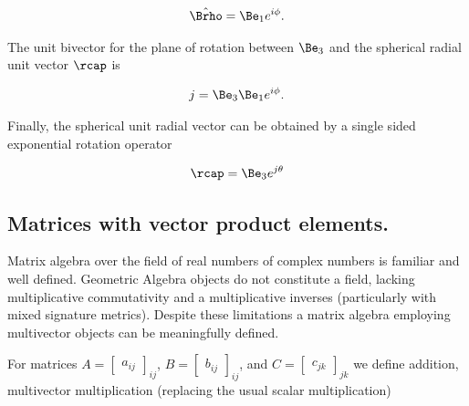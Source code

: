 \begin{align}\label{eqn:mp60}
\hat{\Brho} = \Be_1 e^{i \phi}.
\end{align}

The unit bivector for the plane of rotation between $\Be_3$ and the spherical radial unit vector $\rcap$ is

\begin{align}\label{eqn:mp70}
j = \Be_3 \Be_1 e^{i \phi}.
\end{align}

Finally, the spherical unit radial vector can be obtained by a single sided exponential rotation operator

\begin{align}\label{eqn:mp80}
\rcap = \Be_3 e^{j \theta}
\end{align}



\subsection{Matrices with vector product elements.}

Matrix algebra over the field of real numbers of complex numbers is familiar and well defined.  Geometric Algebra objects do not constitute a field, lacking multiplicative commutativity and a multiplicative inverses (particularly with mixed signature metrics).  Despite these limitations a matrix algebra employing multivector objects can be meaningfully defined.

For matrices $A = {\begin{bmatrix} a_{ij} \end{bmatrix}}_{ij}$, $B = {\begin{bmatrix} b_{ij} \end{bmatrix}}_{ij}$, and $C = {\begin{bmatrix} c_{jk} \end{bmatrix}}_{jk}$ we define addition, multivector multiplication (replacing the usual scalar multiplication)

